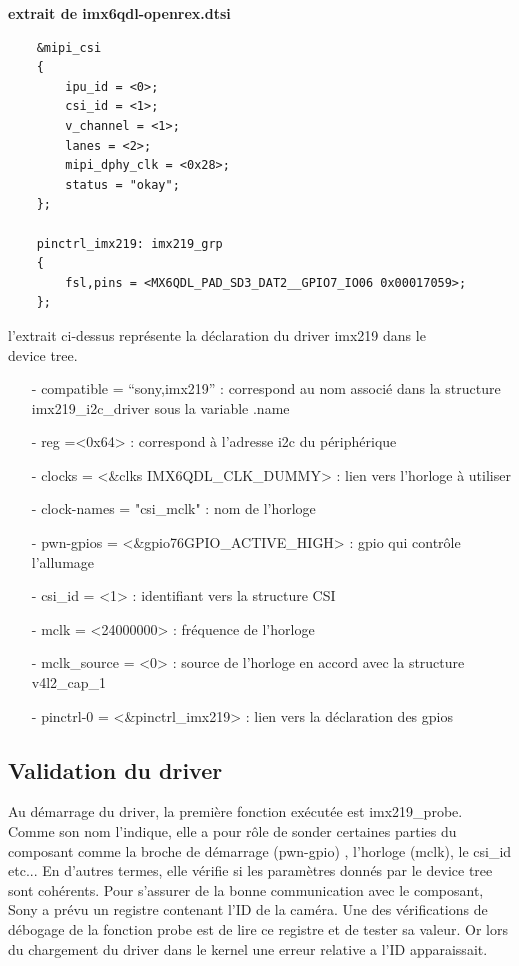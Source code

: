 {\textbf{extrait de imx6qdl-openrex.dtsi}

\begin{lstlisting}
    &mipi_csi 
    {
        ipu_id = <0>;
        csi_id = <1>;
        v_channel = <1>;
        lanes = <2>;
        mipi_dphy_clk = <0x28>;
        status = "okay";
    };

    pinctrl_imx219: imx219_grp
    {
        fsl,pins = <MX6QDL_PAD_SD3_DAT2__GPIO7_IO06 0x00017059>;
    };
\end{lstlisting}

l’extrait ci-dessus représente la déclaration du driver imx219 dans le \\
device tree.

\begin{itemize}
    \item[-]compatible = “sony,imx219” : correspond au nom associé
    dans la structure imx219\_i2c\_driver sous la variable .name
    \item[-]reg =<0x64> : correspond à l’adresse i2c du périphérique
    \item[-] clocks = <\&clks IMX6QDL\_CLK\_DUMMY> : lien vers l'horloge à utiliser
    \item[-] clock-names = "csi\_mclk" : nom de l’horloge
    \item[-] pwn-gpios = <\&gpio76GPIO\_ACTIVE\_HIGH> : gpio qui contrôle l’allumage
    \item[-] csi\_id = <1> : identifiant vers la structure CSI
    \item[-] mclk = <24000000> : fréquence de l’horloge
    \item[-] mclk\_source = <0> : source de l’horloge en accord avec la structure v4l2\_cap\_1
    \item[-] pinctrl-0 = <\&pinctrl\_imx219> : lien vers la déclaration des gpios
\end{itemize}

\subsection{Validation du driver}

Au démarrage du driver, la première fonction exécutée est imx219\_probe. \\
Comme son nom l’indique, elle a pour rôle de sonder certaines parties du composant comme la broche
de démarrage (pwn-gpio) , l’horloge (mclk), le csi\_id etc... En d’autres termes, elle vérifie
si les paramètres donnés par le device tree sont cohérents. Pour s’assurer de la bonne
communication avec le composant, Sony a prévu un registre contenant l’ID de la caméra.
Une des vérifications de débogage de la fonction probe est de lire ce registre et de tester
sa valeur. Or lors du chargement du driver dans le kernel une erreur relative a l’ID
apparaissait. \medskip 

}
